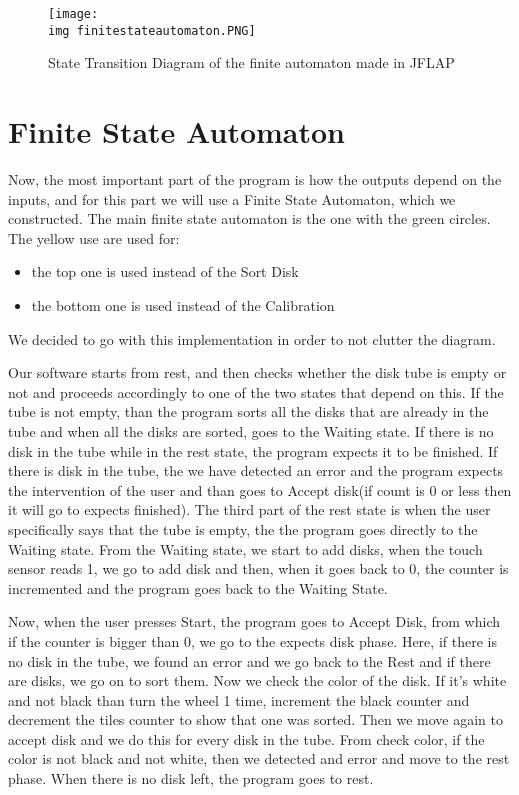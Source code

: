\begin{figure}[h]
	\centering
    \texttt{[image: \\img finitestateautomaton.PNG]}
    \caption{State Transition Diagram of the finite automaton made in JFLAP}
\end{figure}

\section{Finite State Automaton}

Now, the most important part of the program is how the outputs depend on the inputs, and for this part we will use a Finite State Automaton, which we constructed.
The main finite state automaton is the one with the green circles. The yellow use are used for:

\begin{itemize}
\item the top one is used instead of the Sort Disk
\item the bottom one is used instead of the Calibration
\end{itemize}
We decided to go with this implementation in order to not clutter the diagram.

Our software starts from rest, and then checks whether the disk tube is empty or not and proceeds accordingly to one of the two states that depend on this. If the tube is not empty, than the program sorts all the disks that are already in the tube and when all the disks are sorted, goes to the Waiting state. If there is no disk in the tube while in the rest state, the program expects it to be finished. If there is disk in the tube, the we have detected an error and the program expects the intervention of the user and than goes to Accept disk(if count is 0 or less then it will go to expects finished). The third part of the rest state is when the user specifically says that the tube is empty, the the program goes directly to the Waiting state. From the Waiting state, we start to add disks, when the touch sensor reads 1, we go to add disk and then, when it goes back to 0, the counter is incremented and the program goes back to the Waiting State. 

\vspace{2mm}

Now, when the user presses Start, the program goes to Accept Disk, from which if the counter is bigger than 0, we go to the expects disk phase. Here, if there is no disk in the tube, we found an error and we go back to the Rest and if there are disks, we go on to sort them. Now we check the color of the disk. If it’s white and not black than turn the wheel 1 time, increment the black counter and decrement the tiles counter to show that one was sorted. Then we move again to accept disk and we do this for every disk in the tube. From check color, if the color is not black and not white, then we detected and error and move to the rest phase. When there is no disk left, the program goes to rest.

